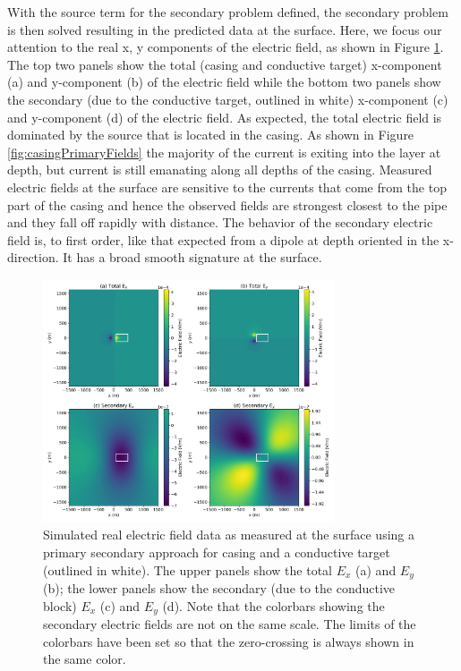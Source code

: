 With the source term for the secondary problem defined, the secondary problem
is then solved resulting in the predicted data at the surface. Here, we focus
our attention to the real x, y components of the electric field, as shown in
Figure \ref{fig:casingData}. The top two panels show the total (casing and
conductive target) x-component (a) and y-component (b)  of the electric field
while the bottom two panels show the secondary (due to the conductive target,
outlined in white) x-component (c) and y-component (d) of the electric field.
As expected, the total electric field is dominated by the source that is
located in the casing. As shown in Figure \ref{fig:casingPrimaryFields} the
majority of the current is exiting into the layer at depth, but current is
still emanating along all depths of the casing. Measured electric fields at
the surface are sensitive to the currents that come from the top part of the
casing and hence the observed fields are strongest closest to the pipe and
they fall off rapidly with distance. The behavior of the secondary electric
field is, to first order, like that expected from a dipole at depth oriented
in the x-direction. It has a broad smooth signature at the surface.

{%
\begin{figure}[htb!]
    \centering
    \includegraphics[width=0.77\textwidth]{images/casingDpred.png}
\caption{Simulated real electric field data as measured at the surface using a
         primary secondary approach for casing and a conductive target (outlined
         in white). The upper panels show the total $E_x$ (a) and $E_y$ (b); the
         lower panels show the secondary (due to the conductive block) $E_x$ (c)
         and $E_y$ (d). Note that the colorbars showing the secondary electric
         fields are not on the same scale. The limits of the colorbars have been set
         so that the zero-crossing is always shown in the same color.}
\label{fig:casingData}
\end{figure}
}

